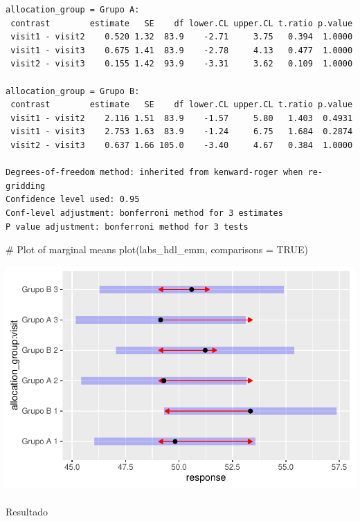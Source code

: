 \documentclass[
  12pt,
]{article}
\makeatletter
\let\oldparagraph\paragraph
\renewcommand{\paragraph}{
    \@ifstar
      \xxxParagraphStar
      \xxxParagraphNoStar
  }
\newcommand{\xxxParagraphStar}[1]{\oldparagraph*{#1}\mbox{}}
\newcommand{\xxxParagraphNoStar}[1]{\oldparagraph{#1}\mbox{}}
\newenvironment{Shaded}{\begin{snugshade}}{\end{snugshade}}
\newcommand{\AttributeTok}[1]{\textcolor[rgb]{0.40,0.45,0.13}{#1}}
\newcommand{\CommentTok}[1]{\textcolor[rgb]{0.37,0.37,0.37}{#1}}
\newcommand{\ConstantTok}[1]{\textcolor[rgb]{0.56,0.35,0.01}{#1}}
\newcommand{\FunctionTok}[1]{\textcolor[rgb]{0.28,0.35,0.67}{#1}}
\newcommand{\NormalTok}[1]{\textcolor[rgb]{0.00,0.23,0.31}{#1}}
\makeatother
\begin{document}
\begin{verbatim}
allocation_group = Grupo A:
 contrast        estimate   SE    df lower.CL upper.CL t.ratio p.value
 visit1 - visit2    0.520 1.32  83.9    -2.71     3.75   0.394  1.0000
 visit1 - visit3    0.675 1.41  83.9    -2.78     4.13   0.477  1.0000
 visit2 - visit3    0.155 1.42  93.9    -3.31     3.62   0.109  1.0000

allocation_group = Grupo B:
 contrast        estimate   SE    df lower.CL upper.CL t.ratio p.value
 visit1 - visit2    2.116 1.51  83.9    -1.57     5.80   1.403  0.4931
 visit1 - visit3    2.753 1.63  83.9    -1.24     6.75   1.684  0.2874
 visit2 - visit3    0.637 1.66 105.0    -3.40     4.67   0.384  1.0000

Degrees-of-freedom method: inherited from kenward-roger when re-gridding 
Confidence level used: 0.95 
Conf-level adjustment: bonferroni method for 3 estimates 
P value adjustment: bonferroni method for 3 tests 
\end{verbatim}

\begin{Shaded}
\begin{Highlighting}[]
\CommentTok{\# Plot of marginal means}
\FunctionTok{plot}\NormalTok{(labs\_hdl\_emm, }\AttributeTok{comparisons =} \ConstantTok{TRUE}\NormalTok{)}
\end{Highlighting}
\end{Shaded}

\includegraphics{Outcomes_files/figure-pdf/labs_hdl_sens_emm-1.pdf}

\paragraph{Resultado}\label{resultado-6}
\end{document}

